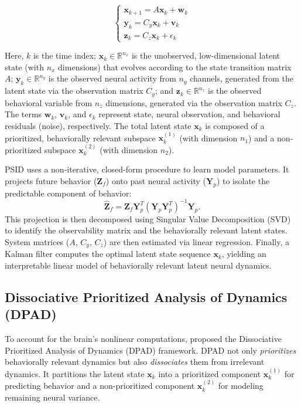 \documentclass[12pt, letterpaper]{article}
\begin{document}
$$
\begin{cases}
\mathbf{x}_{k+1} = A \mathbf{x}_k + \mathbf{w}_k \\
\mathbf{y}_k = C_y \mathbf{x}_k + \mathbf{v}_k \\
\mathbf{z}_k = C_z \mathbf{x}_k + \epsilon_k
\end{cases}
$$

Here, $k$ is the time index; $\mathbf{x}_k \in \mathbb{R}^{n_x}$ is the unobserved, low-dimensional latent state (with $n_x$ dimensions) that evolves according to the state transition matrix $A$; $\mathbf{y}_k \in \mathbb{R}^{n_y}$ is the observed neural activity from $n_y$ channels, generated from the latent state via the observation matrix $C_y$; and $\mathbf{z}_k \in \mathbb{R}^{n_z}$ is the observed behavioral variable from $n_z$ dimensions, generated via the observation matrix $C_z$. The terms $\mathbf{w}_k$, $\mathbf{v}_k$, and $\epsilon_k$ represent state, neural observation, and behavioral residuals (noise), respectively. The total latent state $\mathbf{x}_k$ is composed of a prioritized, behaviorally relevant subspace $\mathbf{x}_k^{(1)}$ (with dimension $n_1$) and a non-prioritized subspace $\mathbf{x}_k^{(2)}$ (with dimension $n_2$).

PSID uses a non-iterative, closed-form procedure to learn model parameters. It projects future behavior ($\mathbf{Z}_f$) onto past neural activity ($\mathbf{Y}_p$) to isolate the predictable component of behavior:
$$\hat{\mathbf{Z}}_f = \mathbf{Z}_f \mathbf{Y}_p^T (\mathbf{Y}_p \mathbf{Y}_p^T)^{-1} \mathbf{Y}_p.$$
This projection is then decomposed using Singular Value Decomposition (SVD) to identify the observability matrix and the behaviorally relevant latent states. System matrices ($A$, $C_y$, $C_z$) are then estimated via linear regression. Finally, a Kalman filter computes the optimal latent state sequence $\mathbf{x}_k$, yielding an interpretable linear model of behaviorally relevant latent neural dynamics.


\subsection{Dissociative Prioritized Analysis of Dynamics (DPAD)}

To account for the brain's nonlinear computations, \textcite{saniDissociativePrioritizedModeling2024} proposed the Dissociative Prioritized Analysis of Dynamics (DPAD) framework. DPAD not only \textit{prioritizes} behaviorally relevant dynamics but also \textit{dissociates} them from irrelevant dynamics. It partitions the latent state $\mathbf{x}_k$ into a prioritized component $\mathbf{x}_k^{(1)}$ for predicting behavior and a non-prioritized component $\mathbf{x}_k^{(2)}$ for modeling remaining neural variance.
\end{document}
